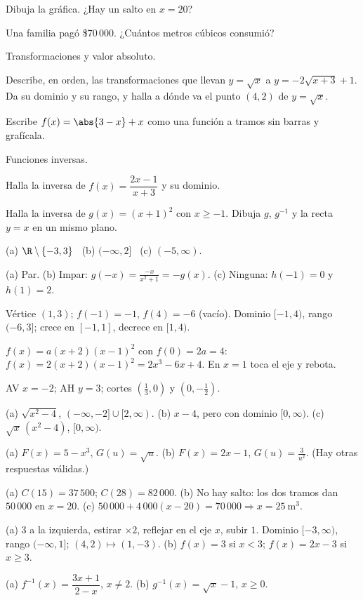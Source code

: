 \documentclass[11pt,a4paper]{article}
\begin{document}
\begin{ejercicios}
\begin{ejercicios}
  \item Dibuja la gráfica. ¿Hay un salto en $x=20$?
  \item Una familia pagó \$70\,000. ¿Cuántos metros cúbicos consumió?
  \end{ejercicios}
\item Transformaciones y valor absoluto.
  \begin{ejercicios}
  \item Describe, en orden, las transformaciones que llevan $y=\sqrt{x}$ a $y=-2\sqrt{x+3}+1$. Da su dominio y su rango,
    y halla a dónde va el punto $(4,2)$ de $y=\sqrt{x}$.
  \item Escribe $f(x)=\abs{3-x}+x$ como una función a tramos sin barras y grafícala.
  \end{ejercicios}
\item Funciones inversas.
  \begin{ejercicios}
  \item Halla la inversa de $f(x)=\dfrac{2x-1}{x+3}$ y su dominio.
  \item Halla la inversa de $g(x)=(x+1)^2$ con $x\ge-1$. Dibuja $g$, $g^{-1}$ y la recta $y=x$ en un mismo plano.
  \end{ejercicios}
\end{ejercicios}

\respuestas
\begin{respuestascortas}
\begin{soluciones}
\item (a) $\R\setminus\{-3,3\}$ \ (b) $(-\infty,2]$ \ (c) $(-5,\infty)$.
\item (a) Par. (b) Impar: $g(-x)=\frac{-x}{x^2+1}=-g(x)$. (c) Ninguna: $h(-1)=0$ y $h(1)=2$.
\item Vértice $(1,3)$; $f(-1)=-1$, $f(4)=-6$ (vacío). Dominio $[-1,4)$, rango $(-6,3]$; crece en $[-1,1]$, decrece en $[1,4)$.
\item $f(x)=a(x+2)(x-1)^2$ con $f(0)=2a=4$: $f(x)=2(x+2)(x-1)^2=2x^3-6x+4$. En $x=1$ toca el eje y rebota.
\item AV $x=-2$; AH $y=3$; cortes $\left(\tfrac13,0\right)$ y $\left(0,-\tfrac12\right)$.
\item (a) $\sqrt{x^2-4}$, $(-\infty,-2]\cup[2,\infty)$. (b) $x-4$, pero con dominio $[0,\infty)$. (c) $\sqrt{x}\,(x^2-4)$, $[0,\infty)$.
\item (a) $F(x)=5-x^3$, $G(u)=\sqrt{u}$. (b) $F(x)=2x-1$, $G(u)=\frac{3}{u^2}$. (Hay otras respuestas válidas.)
\item (a) $C(15)=37\,500$; $C(28)=82\,000$. (b) No hay salto: los dos tramos dan $50\,000$ en $x=20$. (c) $50\,000+4\,000(x-20)=70\,000\Rightarrow x=\SI{25}{\cubic\metre}$.
\item (a) $3$ a la izquierda, estirar $\times2$, reflejar en el eje $x$, subir $1$. Dominio $[-3,\infty)$, rango $(-\infty,1]$; $(4,2)\mapsto(1,-3)$.
  (b) $f(x)=3$ si $x<3$; $f(x)=2x-3$ si $x\ge3$.
\item (a) $f^{-1}(x)=\dfrac{3x+1}{2-x}$, $x\ne2$. (b) $g^{-1}(x)=\sqrt{x}-1$, $x\ge0$.
\end{soluciones}
\end{respuestascortas}
\end{document}

